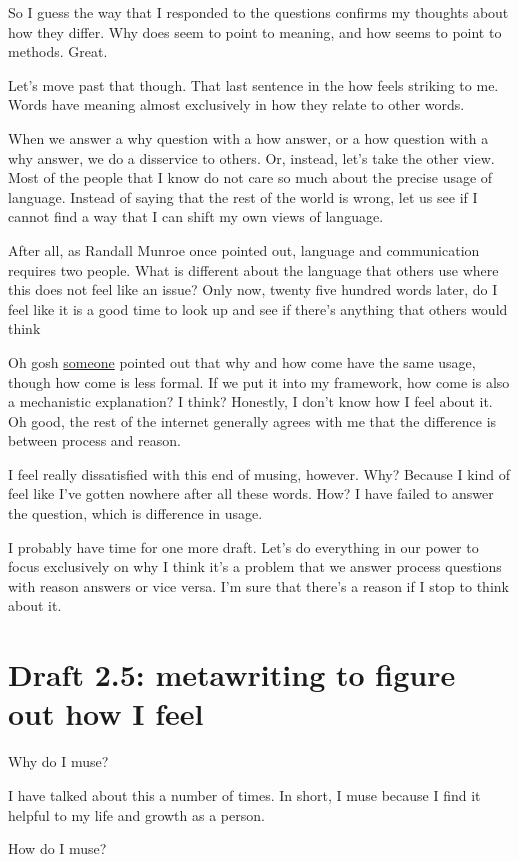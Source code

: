 \documentclass[12pt]{article}[titlepage]
\renewcommand{\,}{\textsuperscript{,}}
\begin{document}
So I guess the way that I responded to the questions confirms my thoughts about how they differ.
Why does seem to point to meaning, and how seems to point to methods.
Great. 

Let's move past that though.
That last sentence in the how feels striking to me.
Words have meaning almost exclusively in how they relate to other words.

When we answer a why question with a how answer, or a how question with a why answer, we do a disservice to others.
Or, instead, let's take the other view.
Most of the people that I know do not care so much about the precise usage of language.
Instead of saying that the rest of the world is wrong, let us see if I cannot find a way that I can shift my own views of language.

After all, as Randall Munroe once pointed out, language and communication requires two people.
What is different about the language that others use where this does not feel like an issue?
Only now, twenty five hundred words later, do I feel like it is a good time to look up and see if there's anything that others would think

Oh gosh \href{https://english.stackexchange.com/questions/5563/how-come-vs-why}{someone} pointed out that why and how come have the same usage, though how come is less formal.
If we put it into my framework, how come is also a mechanistic explanation?
I think?
Honestly, I don't know how I feel about it.
Oh good, the rest of the internet generally agrees with me that the difference is between process and reason.

I feel really dissatisfied with this end of musing, however.
Why?
Because I kind of feel like I've gotten nowhere after all these words.
How?
I have failed to answer the question, which is difference in usage.

I probably have time for one more draft.
Let's do everything in our power to focus exclusively on why I think it's a problem that we answer process questions with reason answers or vice versa.
I'm sure that there's a reason if I stop to think about it.
\section{Draft 2.5: metawriting to figure out how I feel}
Why do I muse?

I have talked about this a number of times.
In short, I muse because I find it helpful to my life and growth as a person.

How do I muse?
\end{document}
